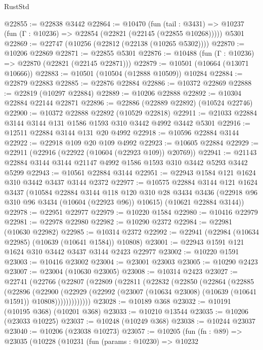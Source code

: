 \begin{lexlean}{RustStd}
\begin{coremodule}
@22855 := @22838 @3442
@22864 := @10470
    (fun (tail : @3431) => @10237 (fun (Γ : @10236) => @22854 (@22821 (@22145 (@22855 @10268)))))
    @5301
@22869 := @22747 (@10256 (@22812 (@22138 (@10265 @5302))))
@22870 := @10206 @22869
@22871 := @22855 @5301
@22876 := @10488 (fun (Γ : @10236) => @22870 (@22821 (@22145 @22871)))
@22879 := @10501 (@10664 (@13071 @10666))
@22883 := @10501 (@10504 (@12888 @10509)) @10284
@22884 := @22879 @22883
@22885 := @22876 @22884
@22886 := @10372 @22869
@22888 := @22819 (@10297 @22884)
@22889 := @10206 @22888
@22892 := @10304 @22884 @22144 @22871
@22896 := @22886 (@22889 @22892) (@10524 @22746)
@22900 := @10372 @22888 @22892 (@10529 @22818)
@22911 := @21033 @22884 @3144 @3144 @131 @1586 @1593 @310 @3442 @4992 @3442 @5301
@22916 := @12511 @22884 @3144 @131 @20 @4992
@22918 := @10596 @22884 @3144
@22922 := @22918 @109 @20 @109 @4992
@22923 := @10605 @22884
@22929 := @22911 (@22916 (@22922 (@10604 (@22923 @109)) @20769))
@22941 := @21143 @22884 @3144 @3144 @21147 @4992 @1586 @1593 @310 @3442 @5293 @3442 @5299
@22943 := @10561 @22884 @3144
@22951 := @22943 @1584 @121 @1624 @310 @3442 @3437 @3144 @2372
@22977 := @10575
    @22884
    @3144
    @121
    @1624
    @3437
    (@10584
      @22884
      @3144
      @118
      @120
      @310
      @28
      @3434
      @3436
      (@22918 @96 @310 @96 @3434 (@10604 (@22923 @96)) @10615)
      (@10621 @22884 @3144))
@22978 := @22951 @22977
@22979 := @10220 @1584
@22980 := @10416 @22979
@22981 := @22978 @22980
@22982 := @10290 @2372
@22984 := @22981 (@10630 @22982)
@22985 := @10314 @2372
@22992 := @22941 (@22984 (@10634 @22985) (@10639 (@10641 @1584)) @10808)
@23001 := @22943 @1591 @121 @1624 @310 @3442 @3437 @3144 @2423 @22977
@23002 := @10220 @1591
@23003 := @10416 @23002
@23004 := @23001 @23003
@23005 := @10290 @2423
@23007 := @23004 (@10630 @23005)
@23008 := @10314 @2423
@23027 := @22741
    (@22766
      (@22807
        (@22809
          (@22811
            (@22832
              (@22850
                (@22864
                  (@22885
                    (@22896
                      (@22900
                        (@22929
                          (@22992
                            (@23007 (@10634 @23008) (@10639 (@10641 @1591)) @10808)))))))))))))
@23028 := @10189 @368
@23032 := @10191 (@10195 @368) (@10201 @368)
@23033 := @10210 @13544
@23035 := @10206 (@23033 @10225)
@23037 := @10248 (@10249 @368)
@23038 := @10244 @23037
@23040 := @10206 (@23038 @10273)
@23057 := @10205
    (fun (fn : @89) =>
    @23035
      (@10228
        (@10231
          (fun (params : @10230) =>
          @10232

\end{coremodule}
\end{lexlean}
